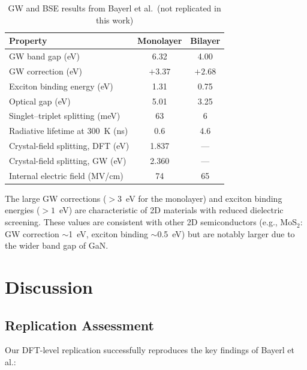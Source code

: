 \documentclass[11pt]{article}
\begin{document}
\begin{table}[H]
\centering
\caption{GW and BSE results from Bayerl et al.\ (not replicated in this work)}
\label{tab:gw_bse}
\begin{tabular}{@{}lcc@{}}
\toprule
\textbf{Property} & \textbf{Monolayer} & \textbf{Bilayer} \\
\midrule
GW band gap (eV) & 6.32 & 4.00 \\
GW correction (eV) & $+3.37$ & $+2.68$ \\
Exciton binding energy (eV) & 1.31 & 0.75 \\
Optical gap (eV) & 5.01 & 3.25 \\
Singlet--triplet splitting (meV) & 63 & 6 \\
Radiative lifetime at 300~K (ns) & 0.6 & 4.6 \\
\midrule
Crystal-field splitting, DFT (eV) & 1.837 & --- \\
Crystal-field splitting, GW (eV) & 2.360 & --- \\
Internal electric field (MV/cm) & 74 & 65 \\
\bottomrule
\end{tabular}
\end{table}

The large GW corrections ($>3$~eV for the monolayer) and exciton binding energies ($>1$~eV) are characteristic of 2D materials with reduced dielectric screening. These values are consistent with other 2D semiconductors (e.g., MoS$_2$: GW correction $\sim$1~eV, exciton binding $\sim$0.5~eV) but are notably larger due to the wider band gap of GaN.

\section{Discussion}

\subsection{Replication Assessment}

Our DFT-level replication successfully reproduces the key findings of Bayerl et al.:
\end{document}
